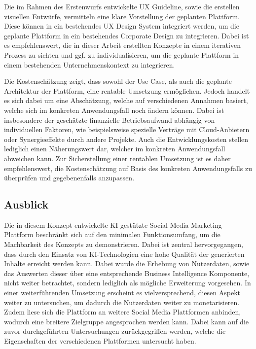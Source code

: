 Die im Rahmen des Erstenwurfs entwickelte UX Guideline, sowie die erstellen visuellen Entwürfe, vermitteln eine klare Vorstellung der geplanten Plattform.
Diese können in ein bestehendes UX Design System integriert werden, um die geplante Plattform in ein bestehendes Corporate Design zu integrieren.
Dabei ist es empfehlenswert, die in dieser Arbeit erstellten Konzepte in einem iterativen Prozess zu sichten und ggf. zu individualisieren, um die geplante Plattform in einem bestehenden Unternehmenskontext zu integrieren.

Die Kostenschätzung zeigt, dass sowohl der Use Case, als auch die geplante Architektur der Plattform, eine rentable Umsetzung ermöglichen.
Jedoch handelt es sich dabei um eine Abschätzung, welche auf verschiedenen Annahmen basiert, welche sich im konkreten Anwendungsfall noch ändern können.
Dabei ist insbesondere der geschätzte finanzielle Betriebsaufwand abhängig von individuellen Faktoren, wie beispielsweise spezielle Verträge mit Cloud-Anbietern oder Synergieeffekte durch andere Projekte.
Auch die Entwicklungskosten stellen lediglich einen Näherungswert dar, welcher im konkreten Anwendungsfall abweichen kann.
Zur Sicherstellung einer rentablen Umsetzung ist es daher empfehlenswert, die Kostenschätzung auf Basis des konkreten Anwendungsfalls zu überprüfen und gegebenenfalls anzupassen.

\subsection{Ausblick}
Die in diesem Konzept entwickelte KI-gestützte Social Media Marketing Plattform beschränkt sich auf den minimalen Funktionsumfang, um die Machbarkeit des Konzepts zu demonstrieren.
Dabei ist zentral hervorgegangen, dass durch den Einsatz von KI-Technologien eine hohe Qualität der generierten Inhalte erreicht werden kann.
Dabei wurde die Erhebung von Nutzerdaten, sowie das Auswerten dieser über eine entsprechende Business Intelligence Komponente, nicht weiter betrachtet, sondern lediglich als mögliche Erweiterung vorgesehen.
In einer weiterführenden Umsetzung erscheint es vielversprechend, diesen Aspekt weiter zu untersuchen, um dadurch die Nutzerdaten weiter zu monetarisieren.
Zudem liese sich die Plattform an weitere Social Media Plattformen anbinden, wodurch eine breitere Zielgruppe angesprochen werden kann.
Dabei kann auf die zuvor durchgeführten Untersuchungen zurückgegriffen werden, welche die Eigenschaften der verschiedenen Plattformen untersucht haben.